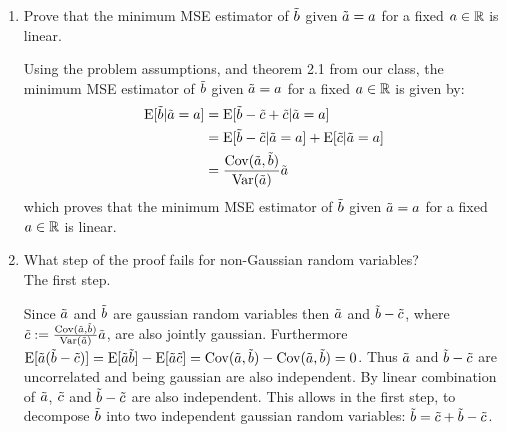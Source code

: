 \documentclass[12pt,twoside]{article}
\begin{document}
\begin{enumerate}
\begin{enumerate}
  \item Prove that the minimum MSE estimator of $\tilde{ b }$ given $\tilde{  a }=a$ for a fixed $a \in \mathbb{R}$ is linear. 
  
  Using the problem assumptions, and theorem 2.1 from our class, the minimum MSE estimator of $\tilde{ b }$ given $\tilde{  a }=a$ for a fixed $a \in \mathbb{R}$ is given by:
  \begin{align*}
  	\E[\rb | \ra = a]		&=	\E[\rb-  \rnd{c} +  \rnd{c} | \ra= a]	\\
					&=	\E[\rb-  \rnd{c} | \ra= a] + \E[\rnd{c} | \ra= a] \\
					&=	\frac{\cov(\ra,\rb)}{\var(\ra)} \ra
  \end{align*}
  which proves that the  minimum MSE estimator of $\tilde{ b }$ given $\tilde{  a }=a$ for a fixed $a \in \mathbb{R}$ is linear.
  
  \item What step of the proof fails for non-Gaussian random variables?\\
  The first step.
  
  Since $\tilde{  a }$ and $\tilde{  b }$ are gaussian random variables then $\tilde{  a }$ and $\tilde{  b } -  \tilde{ c }$, where $\rnd{c} := \frac{\cov(\ra,\rb)}{\var(\ra)}\ra$, are also jointly gaussian.
  Furthermore $\E[\ra (\rb-  \rnd{c})] = \E[\ra \rb] - \E[\ra \rnd{c}] = \cov(\ra,\rb) - \cov(\ra,\rb) = 0$. Thus $\tilde{  a }$ and $\tilde{  b } - \tilde{ c }$ are uncorrelated and being gaussian are also independent.
  By linear combination of $\tilde{  a }$, $\tilde{ c } $ and $\tilde{  b } - \tilde{ c }$ are also independent.
  This allows in the first step, to decompose $\tilde{  b }$ into two independent gaussian random variables: $\tilde{  b } =\tilde{ c }  + \tilde{  b } -  \tilde{ c }$.
  
  \end{enumerate} 
  
  \newpage


\end{enumerate}
\end{document}
